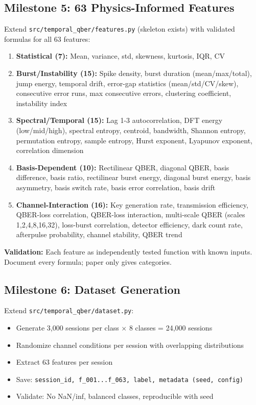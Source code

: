 \subsection{Milestone 5: 63 Physics-Informed Features}
\label{milestone:features}
Extend \texttt{src/temporal\_qber/features.py} (skeleton exists) with validated formulas for all 63 features:

\begin{enumerate}
    \item \textbf{Statistical (7):} Mean, variance, std, skewness, kurtosis, IQR, CV
    \item \textbf{Burst/Instability (15):} Spike density, burst duration (mean/max/total), jump energy, temporal drift, error-gap statistics (mean/std/CV/skew), consecutive error runs, max consecutive errors, clustering coefficient, instability index
    \item \textbf{Spectral/Temporal (15):} Lag 1-3 autocorrelation, DFT energy (low/mid/high), spectral entropy, centroid, bandwidth, Shannon entropy, permutation entropy, sample entropy, Hurst exponent, Lyapunov exponent, correlation dimension
    \item \textbf{Basis-Dependent (10):} Rectilinear QBER, diagonal QBER, basis difference, basis ratio, rectilinear burst energy, diagonal burst energy, basis asymmetry, basis switch rate, basis error correlation, basis drift
    \item \textbf{Channel-Interaction (16):} Key generation rate, transmission efficiency, QBER-loss correlation, QBER-loss interaction, multi-scale QBER (scales 1,2,4,8,16,32), loss-burst correlation, detector efficiency, dark count rate, afterpulse probability, channel stability, QBER trend
\end{enumerate}

\textbf{Validation:} Each feature as independently tested function with known inputs. Document every formula; paper only gives categories.

\subsection{Milestone 6: Dataset Generation}
\label{milestone:dataset}
Extend \texttt{src/temporal\_qber/dataset.py}:
\begin{itemize}
    \item Generate 3,000 sessions per class $\times$ 8 classes = 24,000 sessions
    \item Randomize channel conditions per session with overlapping distributions
    \item Extract 63 features per session
    \item Save: \texttt{session\_id, f\_001...f\_063, label, metadata (seed, config)}
    \item Validate: No NaN/inf, balanced classes, reproducible with seed
\end{itemize}

